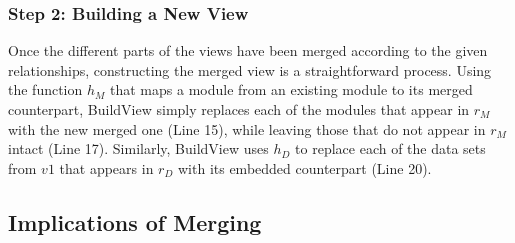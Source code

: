 
\subsubsection{Step 2: Building a New View}

Once the different parts of the views have been merged according to
the given relationships, constructing the merged view is a
straightforward process. Using the function $h_{M}$ that maps a module
from an existing module to its merged counterpart, \textsf{BuildView}
simply replaces each of the modules that appear in $r_{M}$ with the
new merged one (Line 15), while leaving those that do not appear in
$r_{M}$ intact (Line 17). Similarly, \textsf{BuildView} uses $h_{D}$
to replace each of the data sets from $v1$ that appears in $r_{D}$
with its embedded counterpart (Line 20).  

\subsection{Implications of Merging}


